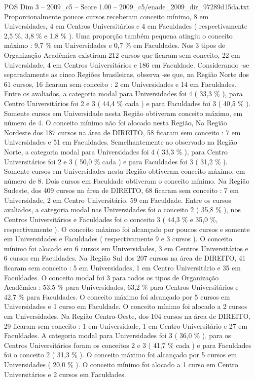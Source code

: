 \begin{textsample}{POS Dim 3 – 2009\_c5 – Score 1.00 – 2009\_c5/enade\_2009\_dir\_97289d15da.txt}
Proporcionalmente poucos cursos receberam conceito mínimo, 8 em Universidades, 4 em Centros Universitários e 4 em Faculdades ( respectivamente 2,5 \%, 3,8 \% e 1,8 \% ).
Uma proporção também pequena atingiu o conceito máximo : 9,7 \% em Universidades e 0,7 \% em Faculdades.
Nos 3 tipos de Organização Acadêmica existiram 212 cursos que ficaram sem conceito, 22 em Universidade, 4 em Centros Universitários e 186 em Faculdade.
Considerando -se separadamente as cinco Regiões brasileiras, observa -se que, na Região Norte dos 61 cursos, 16 ficaram sem conceito : 2 em Universidades e 14 em Faculdades.
Entre os avaliados, a categoria modal para Universidades foi 4 ( 33,3 \% ), para Centro Universitários foi 2 e 3 ( 44,4 \% cada ) e para Faculdades foi 3 ( 40,5 \% ).
Somente cursos em Universidade nesta Região obtiveram conceito máximo, em número de 4.
O conceito mínimo não foi alocado nesta Região, Na Região Nordeste dos 187 cursos na área de DIREITO, 58 ficaram sem conceito : 7 em Universidades e 51 em Faculdades.
Semelhantemente ao observado na Região Norte, a categoria modal para Universidades foi 4 ( 33,3 \% ), para Centro Universitários foi 2 e 3 ( 50,0 \% cada ) e para Faculdades foi 3 ( 31,2 \% ).
Somente cursos em Universidades nesta Região obtiveram conceito máximo, em número de 8.
Dois cursos em Faculdade obtiveram o conceito mínimo.
Na Região Sudeste, dos 409 cursos na área de DIREITO, 68 ficaram sem conceito : 7 em Universidade, 2 em Centro Universitário, 59 em Faculdade.
Entre os cursos avaliados, a categoria modal nas Universidades foi o conceito 2 ( 35,8 \% ), nos Centros Universitários e Faculdades foi o conceito 3 ( 44,3 \% e 35,0 \%, respectivamente ).
O conceito máximo foi alcançado por poucos cursos e somente em Universidades e Faculdades ( respectivamente 9 e 3 cursos ).
O conceito mínimo foi alocado em 6 cursos em Universidades, 3 em Centros Universitários e 6 cursos em Faculdades.
Na Região Sul dos 207 cursos na área de DIREITO, 41 ficaram sem conceito : 5 em Universidades, 1 em Centro Universitário e 35 em Faculdades.
O conceito modal foi 3 para todos os tipos de Organização Acadêmica : 53,5 \% para Universidades, 63,2 \% para Centros Universitários e 42,7 \% para Faculdades.
O conceito máximo foi alcançado por 5 cursos em Universidades e 1 curso em Faculdade.
O conceito mínimo foi alocado a 2 cursos em Universidades.
Na Região Centro-Oeste, dos 104 cursos na área de DIREITO, 29 ficaram sem conceito : 1 em Universidade, 1 em Centro Universitário e 27 em Faculdades.
A categoria modal para Universidades foi 3 ( 36,0 \% ), para os Centros Universitários foram os conceitos 2 e 3 ( 41,7 \% cada ) e para Faculdades foi o conceito 2 ( 31,3 \% ).
O conceito máximo foi alcançado por 5 cursos em Universidades ( 20,0 \% ).
O conceito mínimo foi alocado a 1 curso em Centro Universitários e 2 cursos em Faculdades.

\end{textsample}
